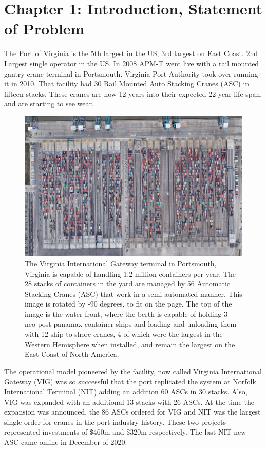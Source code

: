 \documentclass[journal=jacsat,manuscript=article]{achemso}
\begin{document}
\section{Chapter 1: Introduction, Statement of Problem}
The Port of Virginia is the 5th largest in the US, 3rd largest on East Coast. 2nd Largest single operator in the US. In 2008 APM-T went live with a rail mounted gantry crane terminal in Portsmouth. Virginia Port Authority took over running it in 2010. That facility had 30 Rail Mounted Auto Stacking Cranes (ASC) in fifteen stacks. These cranes are now 12 years into their expected 22 year life span, and are starting to see wear. 
\begin{figure}
	\centering
	\includegraphics[width=0.7\linewidth]{"Figures/VIG Overview"}
	\caption[VIG Terminal Areal Image]{The Virginia International Gateway terminal in Portsmouth, Virginia is capable of handling 1.2 million containers per year.  The 28 stacks of containers in the yard are managed by 56 Automatic Stacking Cranes (ASC) that work in a semi-automated manner.  This image is rotated by -90 degrees, to fit on the page.  The top of the image is the water front, where the berth is capable of holding 3 neo-post-panamax container ships and loading and unloading them with 12 ship to shore cranes, 4 of which were the largest in the Western Hemisphere when installed, and remain the largest on the East Coast of North America.}
	\label{fig:VIG_overhead}
\end{figure}
The operational model pioneered by the facility, now called Virginia International Gateway (VIG) was so successful that the port replicated the system at Norfolk International Terminal (NIT) adding an addition 60 ASCs in 30 stacks. Also, VIG was expanded with an additional 13 stacks with 26 ASCs. At the time the expansion was announced, the 86 ASCs ordered for VIG and NIT was the largest single order for cranes in the port industry history. These two projects represented investments of \$460m and \$320m respectively.  The last NIT new ASC came online in December of 2020. 
\end{document}

